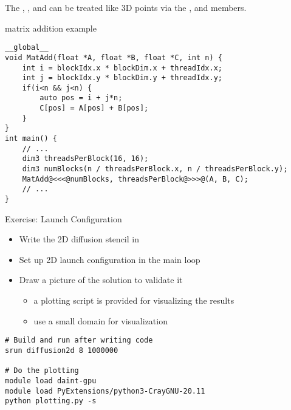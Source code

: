 \documentclass[aspectratio=43]{beamer}
\begin{document}
\begin{frame}[fragile]{}

    The , ,  and  can be treated like 3D points via the ,  and  members.
    \begin{code}{matrix addition example}
        \begin{lstlisting}[style=boxcudatiny]
__global__
void MatAdd(float *A, float *B, float *C, int n) {
    int i = blockIdx.x * blockDim.x + threadIdx.x;
    int j = blockIdx.y * blockDim.y + threadIdx.y;
    if(i<n && j<n) {
        auto pos = i + j*n;
        C[pos] = A[pos] + B[pos];
    }
}
int main() {
    // ...
    dim3 threadsPerBlock(16, 16);
    dim3 numBlocks(n / threadsPerBlock.x, n / threadsPerBlock.y);
    MatAdd@<<<@numBlocks, threadsPerBlock@>>>@(A, B, C);
    // ...
}
        \end{lstlisting}
   \end{code}

\end{frame}

\begin{frame}[fragile]{Exercise: Launch Configuration}
    \begin{itemize}
        \item Write the 2D diffusion stencil in 
        \item Set up 2D launch configuration in the main loop
        \item Draw a picture of the solution to validate it
        \begin{itemize}
            \item a plotting script is provided for visualizing the results
            \item use a small domain for visualization
        \end{itemize}
    \end{itemize}

    \begin{terminal}{}
        \begin{lstlisting}[style=terminal]
# Build and run after writing code
srun diffusion2d 8 1000000

# Do the plotting
module load daint-gpu
module load PyExtensions/python3-CrayGNU-20.11
python plotting.py -s
        \end{lstlisting}
    \end{terminal}
\end{frame}
\end{document}

